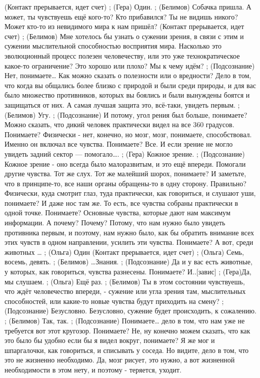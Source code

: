 (Контакт прерывается, идет счет)
;	(Гера) Один.
;	(Белимов) Собачка пришла. А может, ты чувствуешь ещё кого-то? Кто прибавился? Ты не видишь никого? Может кто-то из невидимого мира к нам пришёл?
(Контакт прерывается, идет счет)
;	(Белимов) Мне хотелось бы узнать о сужении зрения,  в связи с этим и сужении мыслительной способностью восприятия мира. Насколько это эволюционный процесс полезен человечеству, или это уже технократическое какое-то ограничение? Это хорошо или плохо? Мы к чему идём?  
;	(Подсознание) Нет, понимаете… Как можно сказать о полезности или о вредности? Дело в том, что когда вы  общались более близко с природой и были среди природы, и для вас было множество противников, которых вы боялись и были вынуждены боятся и защищаться от них. А самая лучшая защита это, всё-таки, увидеть первым.
;	(Белимов) Угу.
;	(Подсознание) И потому, угол рения был больше, понимаете? Можно сказать, что дикий человек практически видел на все 360 градусов. Понимаете? Физически - нет, конечно, но мозг, мозг, понимаете, способствовал. Именно он включал все чувства. Понимаете? Все. И если зрение не могло увидеть задний сектор — помогало…. 
;	(Гера) Кожное зрение.
;	(Подсознание) Кожное зрение - оно всегда было малоразвитым, и это ещё впереди. Помогали другие чувства. Тот же слух. Тот же малейший шорох, понимаете? И заметьте, что в принципе-то, все наши органы обращены-то в одну сторону. Правильно? Физически, куда смотрит глаз, туда практически, как говориться, и слушают уши, понимаете? И даже нос там же. То есть, все чувства собраны практически в одной точке. Понимаете? Основные чувства, которые дают нам максимум информации. А почему? Почему? Потому, что нам нужно было увидеть противника первым, и поэтому, нам нужно было, как бы обратить внимание всех этих чувств в одном направлении, усилить эти чувства. Понимаете? А вот, среди животных …
;	(Ольга) Один
(Контакт прерывается, идет счет)
;	(Ольга) Семь, восемь, девять.
;	(Белимов) …Знания.
;	(Подсознание) Да и у вас есть животные, у которых, как говориться, чувства разнесены. Понимаете?  И..[завис]
;	(Гера)Да, мы слушаем.
;	(Ольга) Ещё раз.
;	(Белимов) Ты в этом состоянии чувствуешь, что ждёт человечество впереди, - сужение или угла зрения там, мыслительных способностей, или какие-то новые чувства будут приходить на смену?
;	(Подсознание) Безусловно. Безусловно, сужение будет происходить, к сожалению.
;	(Белимов) Так, так.
;	(Подсознание) Понимаете… дело в том, что нам уже не требуется вот этот кругозор. Понимаете? Не, ну конечно можем сказать, что как это было бы удобно  если бы я видел вокруг, понимаете? Я же мог и шпаргалочки, как говориться, и списывать у соседа. Но видите, дело в том, что это не жизненно необходимо. Да, мозг рисует, это нужно, а вот жизненной необходимости в этом нету, и поэтому - теряется, уходит.
